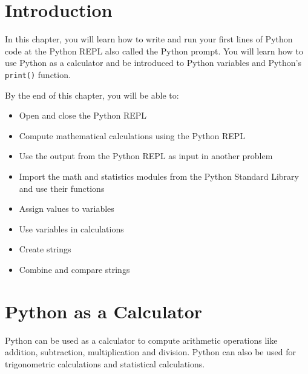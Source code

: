 \documentclass{book}
\newcommand{\passthrough}[1]{#1}
\begin{document}
    
        \hypertarget{introduction}{%
\section{Introduction}\label{introduction}}
    




    
        In this chapter, you will learn how to write and run your first lines of
Python code at the Python REPL also called the Python prompt. You will
learn how to use Python as a calculator and be introduced to Python
variables and Python's \passthrough{\lstinline!print()!} function.
    




    
        By the end of this chapter, you will be able to:

\begin{itemize}
\item
  Open and close the Python REPL
\item
  Compute mathematical calculations using the Python REPL
\item
  Use the output from the Python REPL as input in another problem
\item
  Import the math and statistics modules from the Python Standard
  Library and use their functions
\item
  Assign values to variables
\item
  Use variables in calculations
\item
  Create strings
\item
  Combine and compare strings
\end{itemize}
        \newpage

    




    
        \hypertarget{python-as-a-calculator}{%
\section{Python as a Calculator}\label{python-as-a-calculator}}
    




    
        Python can be used as a calculator to compute arithmetic operations like
addition, subtraction, multiplication and division. Python can also be
used for trigonometric calculations and statistical calculations.
    
\end{document}
